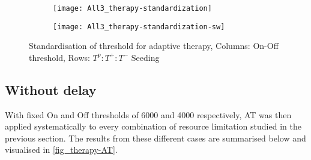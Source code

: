 \begin{figure}[h!]
  \centering
  \begin{subfigure}[b]{\textwidth}
    \centering
    \texttt{[image: All3\_therapy-standardization]}
  \end{subfigure}
  \begin{subfigure}[b]{\textwidth}
    \centering
    \texttt{[image: All3\_therapy-standardization-sw]}
  \end{subfigure}
  \caption[Standardisation of threshold for adaptive therapy]{Standardisation of threshold for adaptive therapy, Columns: On-Off threshold, Rows: $T^p:T^+:T^-$ Seeding}
  \label{fig_therapy-AT_standardization}
\end{figure}

\newpage

\subsection{Without delay}
With fixed On and Off thresholds of 6000 and 4000 respectively, AT was then applied systematically to every combination of resource limitation studied in the previous section. The results from these different cases are summarised below and visualised in \autoref{fig_therapy-AT}.
